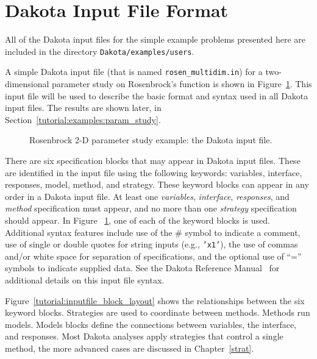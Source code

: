 \section{Dakota Input File Format}\label{tutorial:dakota}

All of the Dakota input files for the simple example problems
presented here are included in the 
directory \texttt{Dakota/examples/users}. 

A simple Dakota
input file (that is named \texttt{rosen\_multidim.in})
for a two-dimensional parameter study on Rosenbrock's
function is shown in Figure~\ref{tutorial:rosenbrock_multidim}.
This input file will be used to
describe the basic format and syntax used in all Dakota input files.
The results are shown later, in Section~\ref{tutorial:examples:param_study}.

\begin{figure}[ht!]
  \centering
  \begin{bigbox}
    \begin{small}
    \end{small}
  \end{bigbox}
  \caption{Rosenbrock 2-D parameter study example: the Dakota input
    file.}
  \label{tutorial:rosenbrock_multidim}
\end{figure}

There are six specification blocks that may appear in Dakota input
files. These are identified in the input file using the following
keywords: variables, interface, responses, model, method, and strategy. These
keyword blocks can appear in any order in a Dakota input file. At
least one \emph{variables}, \emph{interface}, \emph{responses}, and
\emph{method} specification must appear, and no more than one
\emph{strategy} specification should appear. In Figure~
\ref{tutorial:rosenbrock_multidim}, one of each of the keyword blocks is
used. Additional syntax features include use of the \#
symbol to indicate a comment, use of single or double quotes for string inputs
(e.g., \texttt{'x1'}), the use of commas and/or white space for separation of
specifications, and the optional use of ``='' symbols to indicate
supplied data. See the Dakota Reference
Manual~\cite{RefMan} for additional details on this input file syntax.

Figure~\ref{tutorial:inputfile_block_layout} shows the relationships between 
the six keyword blocks. Strategies are used to coordinate between methods. 
Methods run models. Models blocks define the connections between variables, 
the interface, and responses. Most Dakota analyses apply strategies that 
control a single method, the more advanced cases are discussed in Chapter~\ref{strat}.

